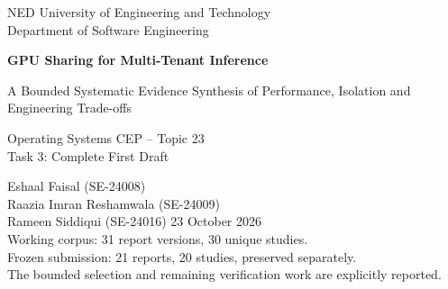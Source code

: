 \documentclass[12pt,a4paper]{article}
\begin{document}
\begin{titlepage}\centering
{\large NED University of Engineering and Technology\\Department of Software Engineering\par}\vspace{28mm}
{\LARGE\bfseries GPU Sharing for Multi-Tenant Inference\par}\vspace{6mm}
{\Large A Bounded Systematic Evidence Synthesis of Performance, Isolation and Engineering Trade-offs\par}\vspace{20mm}
{\large Operating Systems CEP -- Topic 23\\Task 3: Complete First Draft\par}\vspace{16mm}
Eshaal Faisal (SE-24008)\\Raazia Imran Reshamwala (SE-24009)\\Rameen Siddiqui (SE-24016)
\vfill 23 October 2026\\[6mm]
\small Working corpus: 31 report versions, 30 unique studies.\\Frozen submission: 21 reports, 20 studies, preserved separately.\\The bounded selection and remaining verification work are explicitly reported.
\end{titlepage}
\begin{abstract}
GPU sharing for multi-tenant inference requires a choice among resource efficiency, request latency, isolation and implementation cost. This working review synthesizes 30 studies represented by 31 reports. The imported search register contains 4,189 occurrences and 4,075 canonical records after 114 duplicate links. In the continued 559-record branch, title/abstract screening excluded 225 records and advanced 334; 10 additional studies met full-text eligibility, 6 reports were excluded at full text, and 318 advanced records await eligibility or identity closure. These branch counts do not constitute a reconciled final whole-review PRISMA flow. The analysis uses 300 appraisal items, 90 reported observations and two transparent calculations. It combines temporal scheduling, software spatial sharing, hardware partitions, runtime/API mediation, model-memory management and hybrid controls. The evidence supports conditional selection: fine-grained control can protect request latency, while model modification, profiling, transfer bandwidth and shared-context faults constrain its use. No pooled effect or universal winner is supported. The conclusions remain limited by incomplete selection, historical search-provenance gaps, title-only screening and source-version uncertainty.
\end{abstract}
\tableofcontents\clearpage

\clearpage
\clearpage
\end{document}
